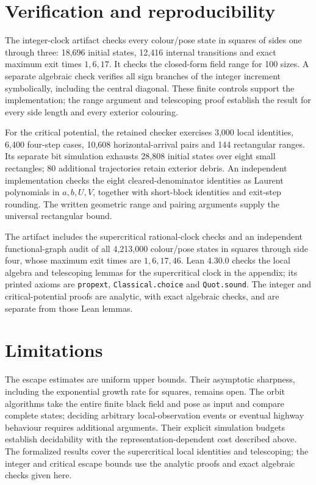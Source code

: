 \documentclass[11pt,a4paper]{article}
\theoremstyle{remark}\newtheorem{remark}[theorem]{Remark}
\begin{document}
\section{Verification and reproducibility}
The integer-clock artifact checks every colour/pose state in squares of sides
one through three: 18,696 initial states, 12,416 internal transitions and
exact maximum exit times $1,6,17$. It checks the closed-form field range for
100 sizes. A separate algebraic check verifies all sign branches of the integer
increment symbolically, including the central diagonal. These finite controls
support the implementation; the range argument and telescoping proof establish
the result for every side length and every exterior colouring.

For the critical potential, the retained checker exercises 3,000 local
identities, 6,400 four-step cases, 10,608 horizontal-arrival pairs and
144 rectangular ranges. Its separate bit simulation exhausts 28,808 initial
states over eight small rectangles; 80 additional trajectories retain exterior
debris. An independent implementation checks the eight cleared-denominator
identities as Laurent polynomials in $a,b,U,V$, together with short-block
identities and exit-step rounding. The written geometric range and pairing
arguments supply the universal rectangular bound.

The artifact includes the supercritical rational-clock checks and an independent
functional-graph audit of all 4,213,000 colour/pose states in squares through
side four, whose maximum exit times are $1,6,17,46$. Lean 4.30.0 checks the
local algebra and telescoping lemmas for the supercritical clock in the
appendix; its printed axioms are \texttt{propext}, \texttt{Classical.choice}
and \texttt{Quot.sound}. The integer and critical-potential proofs are analytic,
with exact algebraic checks, and are separate from those Lean lemmas.

\section{Limitations}
The escape estimates are uniform upper bounds. Their asymptotic sharpness,
including the exponential growth rate for squares, remains open. The orbit
algorithms take the entire finite black field and pose as input and compare
complete states; deciding arbitrary local-observation events or eventual
highway behaviour requires additional arguments. Their explicit simulation
budgets establish decidability with the representation-dependent cost described
above. The formalized results cover the supercritical local identities and
telescoping; the integer and critical escape bounds use the analytic proofs
and exact algebraic checks given here.
\end{document}

